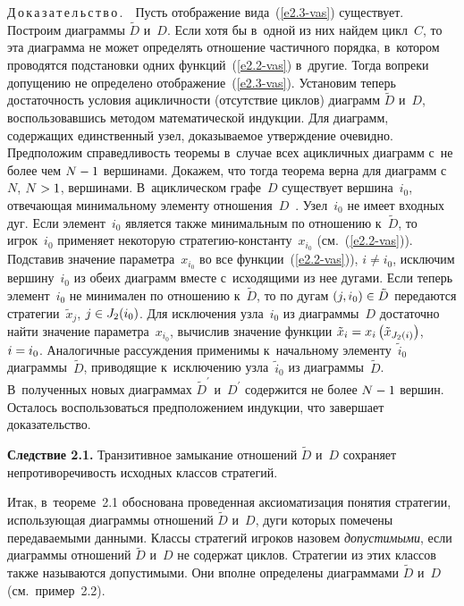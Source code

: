 \begin{multicols}{2}
    \noindent
    Д\,о\,к\,а\,з\,а\,т\,е\,л\,ь\,с\,т\,в\,о\,.\ \ Пусть отображение вида~(\ref{e2.3-vas})
существует. Построим диаграммы $\tilde{D}$ и~$D$. Если хотя бы в~одной из них
найдем цикл~$C$, то эта диаграмма не может определять отношение частичного
порядка, в~котором проводятся подстановки одних функций~(\ref{e2.2-vas})
в~другие. Тогда вопреки допущению не определено отображение~(\ref{e2.3-vas}).
Установим теперь достаточность условия ацикличности (отсутствие циклов)
диаграмм $\tilde{D}$ и~$D$, воспользовавшись методом математической индукции. Для
диаграмм, содержащих единственный узел, доказываемое утверждение очевидно.
Предположим справедливость теоремы в~случае всех ацикличных диаграмм с~не
более чем $N\hm-1$ вершинами. Докажем, что тогда теорема верна для диаграмм
с~$N$, $N\hm>1$, вершинами. В~ациклическом графе~$D$ существует
вершина~$i_0$, отвечающая минимальному элементу
    отношения~$D$~\cite{16-vas}. Узел~$i_0$ не имеет входных дуг. Если
    элемент~$i_0$ является также минимальным по отношению к~$\tilde{D}$, то игрок~$i_0$
применяет некоторую стра\-те\-гию-кон\-стан\-ту~$x_{i_0}$ (см.~(\ref{e2.2-vas})).
Подставив значение параметра~$x_{i_0}$ во все функции~(\ref{e2.2-vas})), $i\not=
i_0$, исключим вершину~$i_0$ из обеих диаграмм вместе с~исходящими из нее
дугами. Если теперь элемент~$i_0$ не минимален по отношению к~$\tilde{D}$, то
по дугам $(j,i_0)\hm\in \tilde{D}$ передаются стратегии~$\tilde{x}_j$, $j\hm\in
J_2(i_0)$. Для исключения узла~$i_0$ из диаграммы~$D$ достаточно найти
значение параметра~$x_{i_0}$, вычислив значение функции $\tilde{x}_i\hm=
x_i\left( \tilde{x}_{J_2(i)}\right)$, $i\hm= i_0$. Аналогичные рассуждения
применимы к~начальному элементу~$\tilde{i}_0$ диаграммы~$\tilde{D}$,
приводящие к~исключению узла~$\tilde{i}_0$ из диаграммы~$\tilde{D}$.
В~полученных новых диаграммах $\tilde{D}^\prime$ и~$D^\prime$ содержится не более
$N\hm-1$ вершин. Осталось воспользоваться предположением индукции, что
завершает доказательство.
    \smallskip

    \noindent
    \textbf{Следствие 2.1.} Транзитивное замыкание отношений $\tilde{D}$ и~$D$
сохраняет непротиворечивость исходных классов стратегий.

    \smallskip

    Итак, в~теореме~2.1 обоснована проведенная аксиоматизация понятия
стратегии, использующая диаграммы отношений $\tilde{D}$ и~$D$, дуги которых
помечены передаваемыми данными. Классы стратегий игроков назовем
\textit{допустимыми}, если диаграммы отношений $\tilde{D}$ и~$D$ не содержат
циклов. Стратегии из этих классов также называются допустимыми. Они вполне
определены диаграммами $\tilde{D}$ и~$D$ (см.\ пример~2.2).


\end{multicols}
